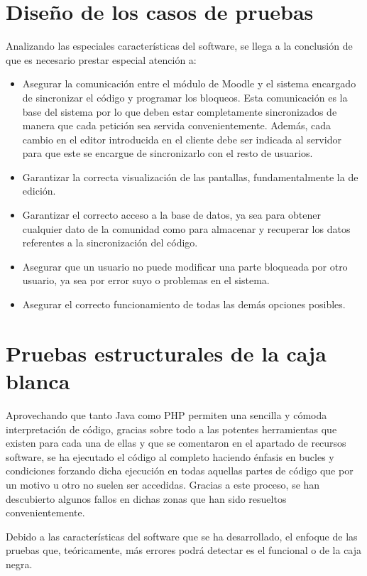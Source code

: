 \section{Diseño de los casos de pruebas}

Analizando las especiales características del software, se llega a la conclusión de que es necesario prestar especial atención a:

\begin{itemize}
	\item Asegurar la comunicación entre el módulo de Moodle y el sistema encargado de sincronizar el código y programar los bloqueos. Esta comunicación es la base del sistema por lo que deben estar completamente sincronizados de manera que cada petición sea servida convenientemente. Además, cada cambio en el editor introducida en el cliente debe ser indicada al servidor para que este se encargue de sincronizarlo con el resto de usuarios.
	\item Garantizar la correcta visualización de las pantallas, fundamentalmente la de edición.
	\item Garantizar el correcto acceso a la base de datos, ya sea para obtener cualquier dato de la comunidad como para almacenar y recuperar los datos referentes a la sincronización del código.
	\item Asegurar que un usuario no puede modificar una parte bloqueada por otro usuario, ya sea por error suyo o problemas en el sistema.
	\item Asegurar el correcto funcionamiento de todas las demás opciones posibles.
\end{itemize}

\section{Pruebas estructurales de la caja blanca}

Aprovechando que tanto Java como PHP permiten una sencilla y cómoda interpretación de código, gracias sobre todo a las potentes herramientas que existen para cada una de ellas y que se comentaron en el apartado de recursos software, se ha ejecutado el código al completo haciendo énfasis en bucles y condiciones forzando dicha ejecución en todas aquellas partes de código que por un motivo u otro no suelen ser accedidas. Gracias a este proceso, se han descubierto algunos fallos en dichas zonas que han sido resueltos convenientemente.

Debido a las características del software que se ha desarrollado, el enfoque de las pruebas que, teóricamente, más errores podrá detectar es el funcional o de la caja negra.

